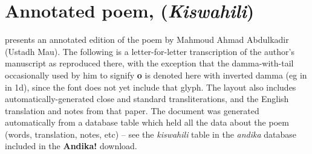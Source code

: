 \chapter{Annotated poem,  (\textit{Kiswahili})}
\renewcommand{\thesection}{D/\arabic{section}}  %
\setcounter{section}{0}  %
\label{appD}

\citet{Abdulkadir2013} presents an annotated edition of the poem  by Mahmoud Ahmad Abdulkadir (Ustadh Mau).  The following is a letter-for-letter transcription of the author's manuscript as reproduced there, with the exception that the damma-with-tail occasionally used by him to signify \textbf{o} is denoted here with inverted damma (eg in  in 1d), since the font does not yet include that glyph.  The layout also includes automatically-generated close and standard transliterations, and the English translation and notes from that paper.  The document was generated automatically from a database table which held all the data about the poem (words, translation, notes, etc) -- see the \textit{kiswahili} table in the \textit{andika} database included in the \textbf{Andika!} download.

